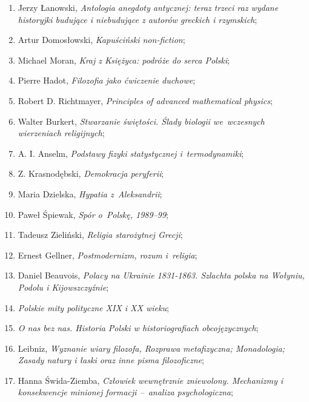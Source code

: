 \documentclass[a4paper,11pt]{article}
\begin{document}
\begin{enumerate}
\item Jerzy Łanowski, \emph{Antologia anegdoty antycznej: teraz trzeci
    raz wydane historyjki budujące i niebudujące z autorów greckich i
    rzymskich};

\item Artur Domosłowski, \emph{Kapuściński non-fiction};

\item Michael Moran, \emph{Kraj z Księżyca: podróże do serca Polski};

\item Pierre Hadot, \emph{Filozofia jako ćwiczenie duchowe};

\item Robert D. Richtmayer, \emph{Principles of advanced mathematical
    physics};

\item Walter Burkert, \emph{Stwarzanie świętości. Ślady biologii
    we~wczesnych wierzeniach religijnych};

\item A. I. Anselm, \emph{Podstawy fizyki statystycznej
    i~termodynamiki};

\item Z. Krasnodębski, \emph{Demokracja peryferii};

\item Maria Dzielska, \emph{Hypatia z~Aleksandrii};

\item Paweł Śpiewak, \emph{Spór o~Polskę, 1989--99};

\item Tadeusz Zieliński, \emph{Religia starożytnej Grecji};

\item Ernest Gellner, \emph{Postmodernizm, rozum i~religia};

\item Daniel Beauvois, \emph{Polacy na Ukrainie 1831-1863. Szlachta
    polska na Wołyniu, Podolu i Kijowszczyźnie};

\item \emph{Polskie mity polityczne XIX i XX wieku};

\item \emph{O nas bez nas. Historia Polski w historiografiach
    obcojęzycznych};

\item Leibniz, \emph{Wyznanie wiary filozofa, Rozprawa metafizyczna;
    Monadologia; Zasady natury i łaski oraz inne pisma filozoficzne};

\item Hanna Świda-Ziemba, \emph{Człowiek wewnętrznie zniewolony.
    Mechanizmy i konsekwencje minionej formacji --~analiza
    psychologiczna};


\end{enumerate}
\end{document}
